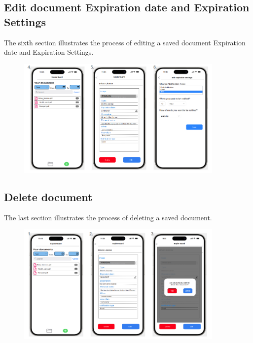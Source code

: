 	\subsection{Edit document Expiration date and Expiration Settings}
		The sixth section illustrates the process of editing a saved document Expiration date and Expiration Settings.
		\begin{figure}[htbp]
			\centering
			\includegraphics[width=0.9\textwidth]{../mockups/edit_doc_expr_1.png}  %
		\end{figure}
		\clearpage
	\subsection{Delete document}
		The last section illustrates the process of deleting a saved document.
		\begin{figure}[htbp]
			\centering
			\includegraphics[width=0.9\textwidth]{../mockups/delete_doc.png}  %
		\end{figure}
		\clearpage
		
